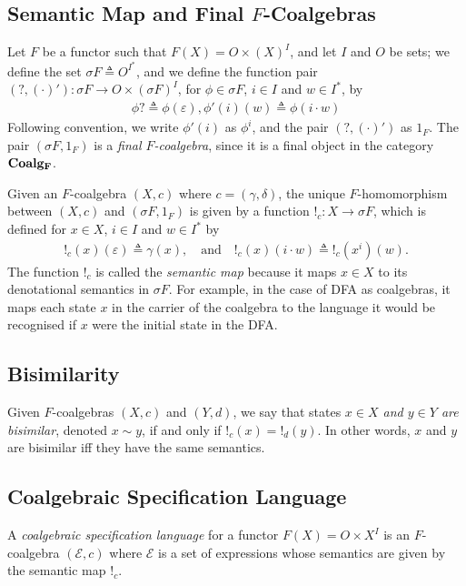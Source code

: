 \subsection{Semantic Map and Final $F$-Coalgebras}
Let $F$ be a functor such that $F(X)=O\times (X)^I$, and let $I$ and $O$ be sets; we define the set $\sigma F\triangleq O^{I^*}$, and we define the function pair $(?, (\cdot)')\colon \sigma F\rightarrow O\times (\sigma F)^I$, for $\phi \in \sigma F$, $i\in I$ and $w\in I^*$, by
\begin{align}
    \phi? \triangleq \phi(\varepsilon),
    \phi'(i)(w) \triangleq \phi(i\cdot w)
\end{align}
Following convention, we write $\phi'(i)$ as $\phi^i$, and the pair $(?, (\cdot)')$ as $1_F$. The pair $(\sigma F, 1_F)$ is a \emph{final $F$-coalgebra}, since it is a final object in the category $\AsCategory{Coalg_F}$.

Given an $F$-coalgebra $(X,c)$ where $c=(\gamma,\delta)$, the unique $F$-homomorphism between $(X,c)$ and $(\sigma F, 1_F)$ is given by a function $!_c\colon X\rightarrow \sigma F$, which is defined for $x\in X$, $i\in I$ and $w\in I^*$ by 
\begin{align}
    !_c(x)(\varepsilon)\triangleq \gamma(x),\quad \text{and} \quad 
    !_c(x)(i\cdot w)\triangleq !_c(x^i)(w).
\end{align}
The function $!_c$ is called the \emph{semantic map} because it maps $x\in X$ to its denotational semantics in $\sigma F$. For example, in the case of DFA as coalgebras, it maps each state $x$ in the carrier of the coalgebra to the language it would be recognised if $x$ were the initial state in the DFA.

\subsection{Bisimilarity}
Given $F$-coalgebras $(X,c)$ and $(Y,d)$, we say that states \emph{$x\in X$ and $y\in Y$ are bisimilar}, denoted $x\sim y$, if and only if $!_c(x)=!_d(y)$. In other words, $x$ and $y$ are bisimilar iff they have the same semantics.

\subsection{Coalgebraic Specification Language}
A \emph{coalgebraic specification language} for a functor $F(X)=O\times X^I$ is an $F$-coalgebra $(\mathcal{E},c)$ where $\mathcal{E}$ is a set of expressions whose semantics are given by the semantic map $!_c$.

